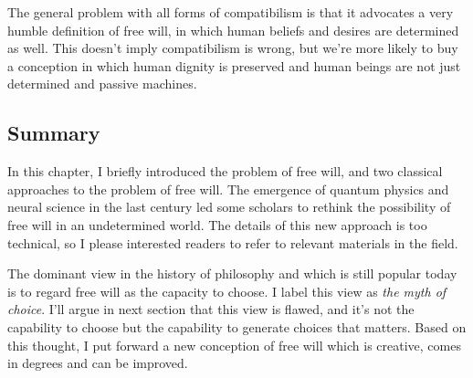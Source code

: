 The general problem with all forms of compatibilism is that it advocates a very humble definition of free will, in which human beliefs and desires are determined as well. This doesn't imply compatibilism is wrong, but we're more likely to buy a conception in which human dignity is preserved and human beings are not just determined and passive machines.

\subsection{Summary}

In this chapter, I briefly introduced the problem of free will, and two classical approaches to the problem of free will. The emergence of quantum physics and neural science in the last century led some scholars to rethink the possibility of free will in an undetermined world. The details of this new approach is too technical, so I please interested readers to refer to relevant materials in the field.

The dominant view in the history of philosophy and which is still popular today is to regard free will as the capacity to choose. I label this view as \emph{the myth of choice}. I'll argue in next section that this view is flawed, and it's not the capability to choose but the capability to generate choices that matters. Based on this thought, I put forward a new conception of free will which is creative, comes in degrees and can be improved.
